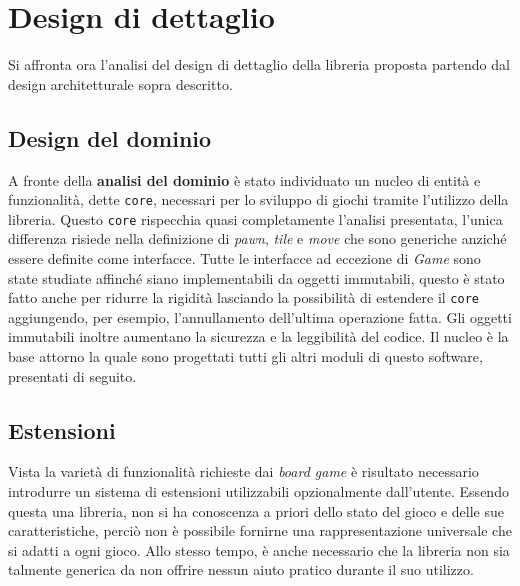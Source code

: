 \section{Design di dettaglio}\label{sec:detailed_design}



Si affronta ora l'analisi del design di dettaglio della libreria proposta partendo dal design architetturale sopra descritto.


\subsection{Design del dominio}
A fronte della \textbf{analisi del dominio} è stato individuato un nucleo di entità e funzionalità, dette \texttt{core}, necessari per lo sviluppo di giochi tramite l'utilizzo della libreria.
%
Questo \texttt{core} rispecchia quasi completamente l'analisi presentata, l'unica differenza risiede nella definizione di \textit{pawn}, \textit{tile} e \textit{move} che sono generiche anziché essere definite come interfacce.
%
Tutte le interfacce ad eccezione di \textit{Game} sono state studiate affinché siano implementabili da oggetti immutabili, questo è stato fatto anche per ridurre la rigidità lasciando la possibilità di estendere il \texttt{core} aggiungendo, per esempio, l'annullamento dell'ultima operazione fatta.
%
Gli oggetti immutabili inoltre aumentano la sicurezza e la leggibilità del codice.
%
Il nucleo è la base attorno la quale sono progettati tutti gli altri moduli di questo software, presentati di seguito.


\subsection{Estensioni}

Vista la varietà di funzionalità richieste dai \textit{board game} è risultato necessario introdurre un sistema di estensioni utilizzabili opzionalmente dall'utente.
%
Essendo questa una libreria, non si ha conoscenza a priori dello stato del gioco e delle sue caratteristiche, perciò non è possibile fornirne una rappresentazione universale che si adatti a ogni gioco.
%
Allo stesso tempo, è anche necessario che la libreria non sia talmente generica da non offrire nessun aiuto pratico durante il suo utilizzo.

